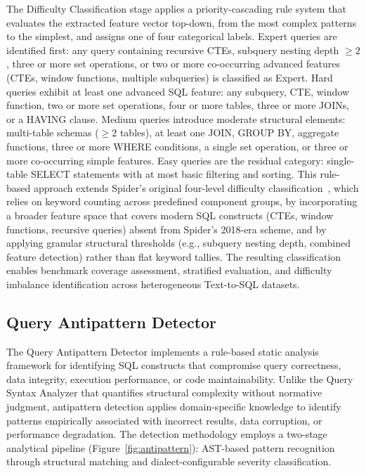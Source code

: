 \documentclass[print]{einformatica}
\begin{document}
The Difficulty Classification stage applies a priority-cascading rule system that evaluates the extracted feature vector top-down, from the most complex patterns to the simplest, and assigns one of four categorical labels. Expert queries are identified first: any query containing recursive CTEs, subquery nesting depth $\ge 2$, three or more set operations, or two or more co-occurring advanced features (CTEs, window functions, multiple subqueries) is classified as Expert. Hard queries exhibit at least one advanced SQL feature: any subquery, CTE, window function, two or more set operations, four or more tables, three or more JOINs, or a HAVING clause. Medium queries introduce moderate structural elements: multi-table schemas ($\ge 2$ tables), at least one JOIN, GROUP BY, aggregate functions, three or more WHERE conditions, a single set operation, or three or more co-occurring simple features. Easy queries are the residual category: single-table SELECT statements with at most basic filtering and sorting. This rule-based approach extends Spider's original four-level difficulty classification~\cite{yu2018spider}, which relies on keyword counting across predefined component groups, by incorporating a broader feature space that covers modern SQL constructs (CTEs, window functions, recursive queries) absent from Spider's 2018-era scheme, and by applying granular structural thresholds (e.g., subquery nesting depth, combined feature detection) rather than flat keyword tallies. The resulting classification enables benchmark coverage assessment, stratified evaluation, and difficulty imbalance identification across heterogeneous Text-to-SQL datasets.

\subsection{Query Antipattern Detector}\label{sec:antipattern_detector}

The Query Antipattern Detector implements a rule-based static analysis framework for identifying SQL constructs that compromise query correctness, data integrity, execution performance, or code maintainability. Unlike the Query Syntax Analyzer that quantifies structural complexity without normative judgment, antipattern detection applies domain-specific knowledge to identify patterns empirically associated with incorrect results, data corruption, or performance degradation. The detection methodology employs a two-stage analytical pipeline (Figure~\ref{fig:antipattern}):  AST-based pattern recognition through structural matching and dialect-configurable severity classification.
\end{document}
